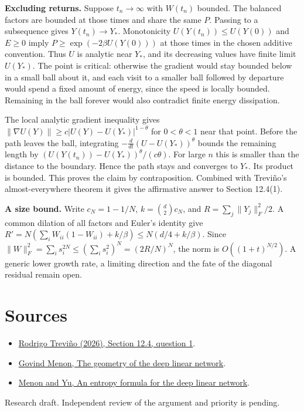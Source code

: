 \documentclass[10pt]{article}
\begin{document}
\textbf{Excluding returns.} Suppose $t_n\to\infty$ with $W(t_n)$ bounded. The balanced factors are bounded at those times and share the same $P$. Passing to a subsequence gives $Y(t_n)\to Y_*$. Monotonicity $U(Y(t_n))\le U(Y(0))$ and $E\ge0$ imply $P\ge\exp(-2\beta U(Y(0)))$ at those times in the chosen additive convention. Thus $U$ is analytic near $Y_*$, and its decreasing values have finite limit $U(Y_*)$. The point is critical: otherwise the gradient would stay bounded below in a small ball about it, and each visit to a smaller ball followed by departure would spend a fixed amount of energy, since the speed is locally bounded. Remaining in the ball forever would also contradict finite energy dissipation.

The local analytic gradient inequality gives $\|\nabla U(Y)\|\ge c|U(Y)-U(Y_*)|^{1-\theta}$ for $0<\theta<1$ near that point. Before the path leaves the ball, integrating $-\frac{d}{dt}(U-U(Y_*))^\theta$ bounds the remaining length by $(U(Y(t_n))-U(Y_*))^\theta/(c\theta)$. For large $n$ this is smaller than the distance to the boundary. Hence the path stays and converges to $Y_*$. Its product is bounded. This proves the claim by contraposition. Combined with Treviño's almost-everywhere theorem it gives the affirmative answer to Section 12.4(1).

\textbf{A size bound.} Write $c_N=1-1/N$, $k=\binom d2 c_N$, and $R=\sum_j\|Y_j\|_F^2/2$. A common dilation of all factors and Euler's identity give
$R'=N(\sum_i W_{ii}(1-W_{ii})+k/\beta)\le N(d/4+k/\beta)$.
Since $\|W\|_F^2=\sum_i s_i^{2N}\le(\sum_i s_i^2)^N=(2R/N)^N$, the norm is $O((1+t)^{N/2})$. A generic lower growth rate, a limiting direction and the fate of the diagonal residual remain open.

\section*{Sources}
\begin{itemize}
\item \href{https://arxiv.org/abs/2610.05551}{Rodrigo Treviño (2026), Section 12.4, question 1}.
\item \href{https://arxiv.org/abs/2411.09004}{Govind Menon, The geometry of the deep linear network}.
\item \href{https://arxiv.org/abs/2509.09088}{Menon and Yu, An entropy formula for the deep linear network}.
\end{itemize}
{\small Research draft. Independent review of the argument and priority is pending.}
\end{document}
